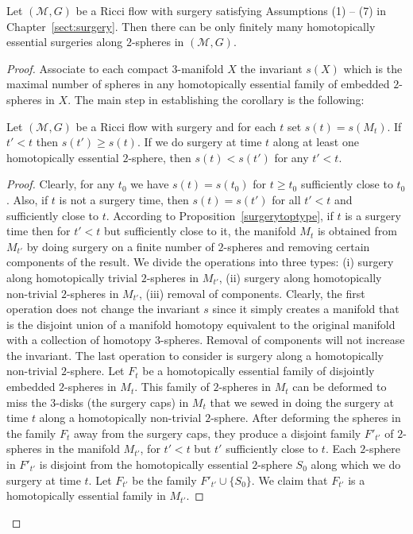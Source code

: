 \begin{proposition}
\label{prop:finitely-many-homotopically-essential-surgeries}
\label{homess}
Let $({\mathcal M},G)$ be a Ricci flow with surgery satisfying
Assumptions (1) -- (7) in Chapter~\ref{sect:surgery}. Then there can
be only finitely many homotopically essential surgeries along
$2$-spheres in $({\mathcal M},G)$.
\end{proposition}


\begin{proof}
 Associate to each compact $3$-manifold $X$
 the invariant $s(X)$ which is the maximal number of spheres in
 any homotopically essential family of embedded $2$-spheres in $X$.
 The main step in establishing the corollary is the following:

\begin{claim}
\label{claim:invariant-s-monotone}
Let $({\mathcal M},G)$ be a Ricci flow with surgery and for each $t$ set
$s(t)=s(M_t)$. If $t'<t$ then $s(t')\ge s(t)$. If  we do surgery at time $t$
along at least one homotopically essential $2$-sphere, then $s(t)<s(t')$ for
any $t'<t$.
\end{claim}

\begin{proof}
Clearly, for any $t_0$ we have $s(t)=s(t_0)$ for $t\ge t_0$
sufficiently close to $t_0$. Also, if $t$ is not a surgery time,
then $s(t)=s(t')$ for all $t'<t$ and sufficiently close to $t$.
According to Proposition~\ref{surgerytoptype}, if $t$ is a surgery
time then for $t'<t$ but sufficiently close to it, the manifold
$M_t$ is obtained from $M_{t'}$  by doing surgery on a finite number
of $2$-spheres and removing certain components of the result. We
divide the operations into three types: (i) surgery along
homotopically trivial $2$-spheres in $M_{t'}$, (ii) surgery along
homotopically non-trivial $2$-spheres in $M_{t'}$, (iii) removal of
components. Clearly, the first operation does not change the
invariant $s$ since it simply creates a manifold that is the
disjoint union of a manifold homotopy equivalent to the original
manifold with a collection of homotopy $3$-spheres. Removal of
components will not increase the invariant. The last operation to
consider is surgery along a homotopically non-trivial $2$-sphere.
Let $F_t$ be a homotopically essential family of disjointly embedded
$2$-spheres in $M_t$. This family of $2$-spheres in $M_t$ can be
deformed to miss the $3$-disks (the surgery caps) in $M_t$ that we
sewed in doing the surgery at time $t$ along a homotopically
non-trivial $2$-sphere. After deforming the spheres in the family
$F_t$ away from the surgery caps, they produce a disjoint family
$F'_{t'}$ of $2$-spheres in the manifold $M_{t'}$, for $t'<t$ but
$t'$ sufficiently close to $t$. Each $2$-sphere in $F'_{t'}$ is
disjoint from the homotopically essential $2$-sphere $S_0$ along
which we do surgery at time $t$. Let $F_{t'}$ be the family
$F'_{t'}\cup \{S_0\}$. We claim that $F_{t'}$ is a homotopically
essential family in $M_{t'}$.


\end{proof}
\end{proof}
